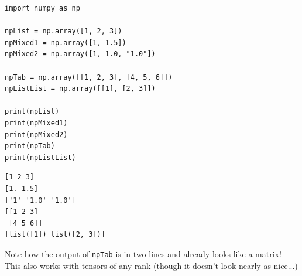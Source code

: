 \begin{frame}[fragile]
%
\vspace{-2pt}
\begin{tcbraster}[raster columns=2,
                  raster equal height,
                  nobeforeafter,
                  raster column skip=0.5cm]
\begin{codebox}
\begin{verbatim}
import numpy as np

npList = np.array([1, 2, 3])
npMixed1 = np.array([1, 1.5])
npMixed2 = np.array([1, 1.0, "1.0"])

npTab = np.array([[1, 2, 3], [4, 5, 6]])
npListList = np.array([[1], [2, 3]])

print(npList)
print(npMixed1)
print(npMixed2)
print(npTab)
print(npListList)
\end{verbatim}
\end{codebox}
%
\begin{cmdbox}
\begin{verbatim}
[1 2 3]
[1. 1.5]
['1' '1.0' '1.0']
[[1 2 3]
 [4 5 6]]
[list([1]) list([2, 3])]
\end{verbatim}
\end{cmdbox}
\end{tcbraster}
%
\begin{hintbox}
\footnotesize
Note how the output of \texttt{npTab} is in two lines and already looks like a matrix!\\
This also works with tensors of any rank (though it doesn't look nearly as nice...)
\end{hintbox}
%
\end{frame}



